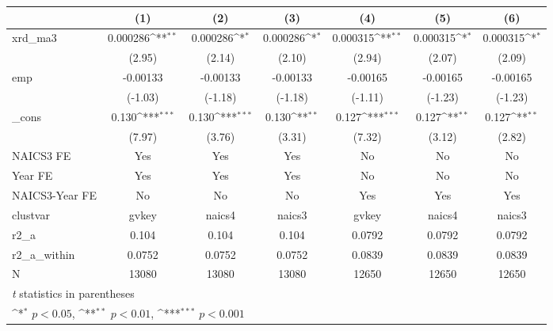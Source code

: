 {
\def\sym#1{\ifmmode^{#1}\else\(^{#1}\)\fi}
\begin{tabular}{l*{6}{c}}
\hline\hline
            &\multicolumn{1}{c}{(1)}         &\multicolumn{1}{c}{(2)}         &\multicolumn{1}{c}{(3)}         &\multicolumn{1}{c}{(4)}         &\multicolumn{1}{c}{(5)}         &\multicolumn{1}{c}{(6)}         \\
\hline
xrd\_ma3     &    0.000286\sym{**} &    0.000286\sym{*}  &    0.000286\sym{*}  &    0.000315\sym{**} &    0.000315\sym{*}  &    0.000315\sym{*}  \\
            &      (2.95)         &      (2.14)         &      (2.10)         &      (2.94)         &      (2.07)         &      (2.09)         \\
[1em]
emp         &    -0.00133         &    -0.00133         &    -0.00133         &    -0.00165         &    -0.00165         &    -0.00165         \\
            &     (-1.03)         &     (-1.18)         &     (-1.18)         &     (-1.11)         &     (-1.23)         &     (-1.23)         \\
[1em]
\_cons      &       0.130\sym{***}&       0.130\sym{***}&       0.130\sym{**} &       0.127\sym{***}&       0.127\sym{**} &       0.127\sym{**} \\
            &      (7.97)         &      (3.76)         &      (3.31)         &      (7.32)         &      (3.12)         &      (2.82)         \\
[1em]
NAICS3 FE   &         Yes         &         Yes         &         Yes         &          No         &          No         &          No         \\
[1em]
Year FE     &         Yes         &         Yes         &         Yes         &          No         &          No         &          No         \\
[1em]
NAICS3-Year FE&          No         &          No         &          No         &         Yes         &         Yes         &         Yes         \\
\hline
clustvar    &       gvkey         &      naics4         &      naics3         &       gvkey         &      naics4         &      naics3         \\
r2\_a        &       0.104         &       0.104         &       0.104         &      0.0792         &      0.0792         &      0.0792         \\
r2\_a\_within &      0.0752         &      0.0752         &      0.0752         &      0.0839         &      0.0839         &      0.0839         \\
N           &       13080         &       13080         &       13080         &       12650         &       12650         &       12650         \\
\hline\hline
\multicolumn{7}{l}{\footnotesize \textit{t} statistics in parentheses}\\
\multicolumn{7}{l}{\footnotesize \sym{*} \(p<0.05\), \sym{**} \(p<0.01\), \sym{***} \(p<0.001\)}\\
\end{tabular}
}
